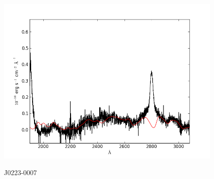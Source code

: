 \documentclass[usenatbib]{mn2e}
\begin{document}
\begin{figure}
\begin{center}
\vspace{5mm}
\includegraphics[width=0.49\linewidth,angle=0]{./red/fe_fit_SBB_14.png}\\

\end{center} 
\caption{J0223-0007 \label{fig:landscape}}   
\end{figure}

\newpage
\end{document}
